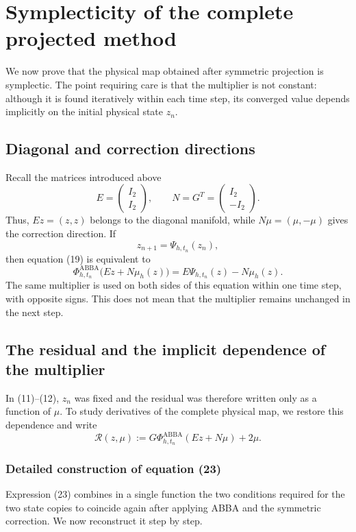 \documentclass[11pt,a4paper]{article}
\newcommand{\Id}{I}
\newcommand{\PhiAB}{\Phi^{\mathrm{ABBA}}_{h,t_n}}
\begin{document}
\section{Symplecticity of the complete projected method}

We now prove that the physical map obtained after symmetric projection is symplectic.
The point requiring care is that the multiplier is not constant: although it is found
iteratively within each time step, its converged value depends implicitly on the initial
physical state $z_n$.

\subsection{Diagonal and correction directions}

Recall the matrices introduced above
\[
 E=
 \begin{pmatrix}
  \Id_2\\ \Id_2
 \end{pmatrix},
 \qquad
 N=G^T=
 \begin{pmatrix}
  \Id_2\\ -\Id_2
 \end{pmatrix}.
\]
Thus, $Ez=(z,z)$ belongs to the diagonal manifold, while
$N\mu=(\mu,-\mu)$ gives the correction direction. If
\[
 z_{n+1}=\Psi_{h,t_n}(z_n),
\]
then equation (19) is equivalent to
\[
 \boxed{
 \PhiAB\bigl(Ez+N\mu_h(z)\bigr)
 =E\Psi_{h,t_n}(z)-N\mu_h(z).
 } \tag{22}
\]
The same multiplier is used on both sides of this equation within one time step, with
opposite signs. This does not mean that the multiplier remains unchanged in the next step.

\subsection{The residual and the implicit dependence of the multiplier}

In (11)--(12), $z_n$ was fixed and the residual was therefore written only as a function
of $\mu$. To study derivatives of the complete physical map, we restore this dependence
and write
\[
 \boxed{
 \mathcal R(z,\mu)
 :=G\PhiAB(Ez+N\mu)+2\mu.
 } \tag{23}
\]

\subsubsection*{Detailed construction of equation (23)}

Expression (23) combines in a single function the two conditions required for the two
state copies to coincide again after applying ABBA and the symmetric correction. We now
reconstruct it step by step.
\end{document}
